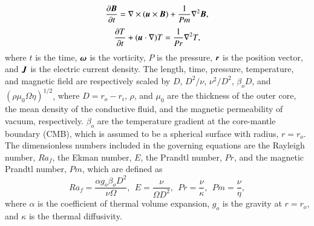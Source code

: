 %
\begin{equation}
\frac{\partial \mbox{\boldmath$B$}}{\partial t} =
 \nabla \times (\mbox{\boldmath$u$} \times \mbox{\boldmath$B$} )
 + \frac{1}{Pm} \nabla^2 \mbox{\boldmath$B$} ,
\label{eq:induction}
\end{equation}
%
\begin{equation}
\frac{\partial T}{\partial t} 
 + ( \mbox{\boldmath$u$} \cdot \nabla ) T =
 \frac{1}{Pr} \nabla^2 T ,
\label{eq:heat}
\end{equation}
%
where $t$ is the time, $\mbox{\boldmath$\omega$}$ is the vorticity, $P$ is the pressure, $\mbox{\boldmath$r$}$ is the position vector, and $\mbox{\boldmath$J$}$ is the electric current density.
The length, time, pressure, temperature, and magnetic field are respectively scaled by $D$, $D^2/\nu$, $\nu^2 /D^2$, $\beta_o D$, and $(\rho \mu_0 \Omega \eta )^{1/2}$, %
{\color{blue}
where $D = r_o - r_i$, $\rho$, and $\mu_0$ are the thickness of the outer core, the mean density of the conductive fluid, and  the magnetic permeability of vacuum, respectively. $\beta_o$ are  the temperature gradient at the core-mantle boundary (CMB), which is
}
{\color{red} assumed to be a spherical surface with radius,} $r = r_o$.
The dimensionless numbers included in the governing equations are the Rayleigh number, $Ra_f$, the Ekman number, $E$, the Prandtl number, $Pr$, and the magnetic Prandtl number, $Pm$, which are defined as
%
\begin{equation}
Ra_f = \frac{\alpha g_o \beta_o D^2}{\nu \Omega},~~
E = \frac{\nu}{\Omega D^2},~~
Pr = \frac{\nu}{\kappa},~~
Pm = \frac{\nu}{\eta},
\label{eq:dimensionless_numbers}
\end{equation}
%
where $\alpha$ is the coefficient of thermal volume expansion, $g_o$ is the gravity at $r = r_o$, and $\kappa$ is the thermal diffusivity.

